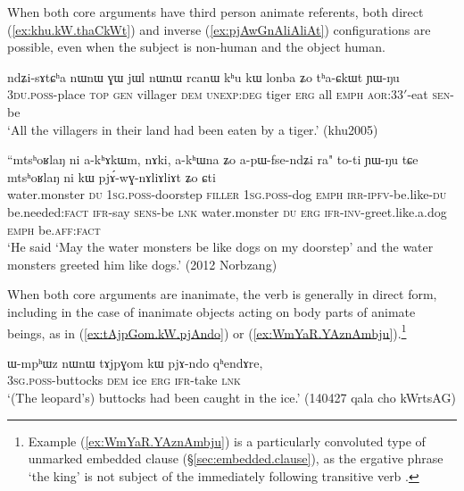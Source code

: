 When both core arguments have third person animate referents, both direct (\ref{ex:khu.kW.thaCkWt}) and inverse (\ref{ex:pjAwGnAliAliAt}) configurations are possible, even when the subject is non-human and the object human.

\begin{exe}
\ex \label{ex:khu.kW.thaCkWt}
\gll ndʑi-sɤtɕʰa nɯnɯ ɣɯ jɯl nɯnɯ rcanɯ kʰu kɯ lonba ʑo tʰa-ɕkɯt ɲɯ-ŋu  \\
\textsc{3du}.\textsc{poss}-place \textsc{top} \textsc{gen} villager \textsc{dem} \textsc{unexp}:\textsc{deg} tiger \textsc{erg} all \textsc{emph} \textsc{aor}:\textsc{3}\fl{}3$'$-eat \textsc{sen}-be \\
 \glt `All the villagers in their land had been eaten by a tiger.'  (khu2005)
\end{exe}

\begin{exe}
\ex \label{ex:pjAwGnAliAliAt}
\gll ``mtsʰoʁlaŋ ni a-kʰɤkɯm, nɤki, a-kʰɯna ʑo a-pɯ-fse-ndʑi ra" to-ti ɲɯ-ŋu tɕe mtsʰoʁlaŋ ni kɯ pjɤ́-wɣ-nɤliɤliɤt ʑo ɕti   \\
water.monster \textsc{du} \textsc{1sg}.\textsc{poss}-doorstep \textsc{filler} \textsc{1sg}.\textsc{poss}-dog \textsc{emph} \textsc{irr}-\textsc{ipfv}-be.like-\textsc{du} be.needed:\textsc{fact} \textsc{ifr}-say \textsc{sens}-be \textsc{lnk} water.monster \textsc{du} \textsc{erg} \textsc{ifr}-\textsc{inv}-greet.like.a.dog \textsc{emph} be.\textsc{aff}:\textsc{fact} \\
\glt `He said `May the water monsters be like dogs on my doorstep' and the water monsters greeted him like dogs.' (2012 Norbzang) 	
\end{exe}

When both core arguments are inanimate, the verb is generally in direct form, including in the case of inanimate objects acting on body parts of animate beings, as in (\ref{ex:tAjpGom.kW.pjAndo}) or (\ref{ex:WmYaR.YAznAmbju}).\footnote{Example (\ref{ex:WmYaR.YAznAmbju}) is a particularly convoluted type of unmarked embedded clause (§\ref{sec:embedded.clause}), as the ergative phrase  `the king' is not subject of the immediately following transitive verb . }

\begin{exe}
\ex \label{ex:tAjpGom.kW.pjAndo}
\gll ɯ-mpʰɯz nɯnɯ tɤjpɣom kɯ pjɤ-ndo qʰendɤre, \\
\textsc{3sg}.\textsc{poss}-buttocks \textsc{dem} ice \textsc{erg} \textsc{ifr}-take \textsc{lnk} \\
\glt `(The leopard's) buttocks had been caught in the ice.' (140427 qala cho kWrtsAG)
\end{exe}

